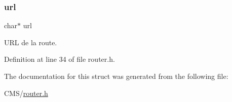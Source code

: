 \mbox{\label{struct__route_ab135e5154c1828bef226a3df98ee3333}} 
\subsubsection{\texorpdfstring{url}{url}}
{\footnotesize\ttfamily char$\ast$ url}

U\+RL de la route. 

Definition at line 34 of file router.\+h.



The documentation for this struct was generated from the following file\+:\begin{DoxyCompactItemize}
\item 
C\+M\+S/\mbox{\hyperlink{router_8h}{router.\+h}}\end{DoxyCompactItemize}
